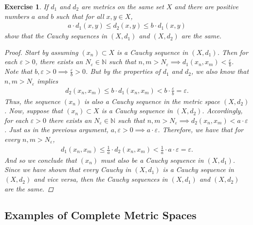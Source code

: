 \documentclass[11pt]{article}
\theoremstyle{mystyle}
\newtheorem{protoexer}{Exercise}[section]
\newenvironment{exer}
{\colorlet{shadecolor}{blue!15}\begin{shaded}\begin{protoexer}}
{\end{protoexer}\end{shaded}}
\begin{document}
\begin{exer}
If $d_1$ and $d_2$ are metrics on the same set $X$ and there are positive numbers $a$ and $b$ such that for all $x, y \in X$,
\begin{align*}
    a \cdot d_1(x, y) \leq d_2(x, y) \leq b \cdot d_1(x, y)
\end{align*}
show that the Cauchy sequences in $(X, d_1)$ and $(X, d_2)$ are the same.
\begin{proof}
Start by assuming $(x_n) \subset X$ is a Cauchy sequence in $(X, d_1)$. Then for each $\varepsilon > 0$, there exists an $N_{\varepsilon} \in \mathbb{N}$ such that $n, m > N_{\varepsilon} \implies d_1(x_n, x_m) < \frac{\varepsilon}{b}$. Note that $b, \varepsilon > 0 \implies \frac{\varepsilon}{b} > 0$. But by the properties of $d_1$ and $d_2$, we also know that $n, m > N_{\varepsilon}$ implies
\begin{align*}
    d_2(x_n, x_m) \leq b \cdot d_1(x_n, x_m) < b \cdot \frac{\varepsilon}{b} = \varepsilon.
\end{align*}
Thus, the sequence $(x_n)$ is also a Cauchy sequence in the metric space $(X, d_2)$.\newline
Now, suppose that $(x_n) \subset X$ is a Cauchy sequence in $(X, d_2)$. Accordingly, for each $\varepsilon > 0$ there exists an $N_{\varepsilon} \in \mathbb{N}$ such that $n, m > N_{\varepsilon} \implies d_2(x_n, x_m) < a \cdot \varepsilon$. Just as in the previous argument, $a, \varepsilon > 0 \implies a \cdot \varepsilon$. Therefore, we have that for every $n, m > N_{\varepsilon}$, 
\begin{align*}
    d_1(x_n, x_m) \leq \frac{1}{a} \cdot d_2(x_n, x_m) < \frac{1}{a} \cdot a \cdot \varepsilon = \varepsilon.
\end{align*}
And so we conclude that $(x_n)$ must also be a Cauchy sequence in $(X, d_1)$.\newline
Since we have shown that every Cauchy in $(X, d_1)$ is a Cauchy sequence in $(X, d_2)$ and vice versa, then the Cauchy sequences in $(X, d_1)$ and $(X, d_2)$ are the same. 
\end{proof}
\end{exer}

\subsection{Examples of Complete Metric Spaces}
\end{document}
